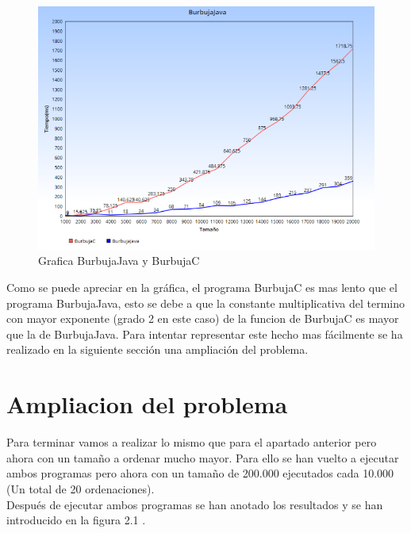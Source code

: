 	\begin{figure}[htb]
		\centering
		\includegraphics[width=1.0\textwidth]{./imagenes/4}
		\caption{Grafica BurbujaJava y BurbujaC} \label{fig:1}
	\end{figure}
	
	Como se puede apreciar en la gráfica, el programa BurbujaC es mas lento que el programa BurbujaJava, esto se debe a que la constante multiplicativa del termino con mayor exponente (grado 2 en este caso) de la funcion de BurbujaC es mayor que la de BurbujaJava. Para intentar representar este hecho mas fácilmente se ha realizado en la siguiente sección una ampliación del problema.\\
	
	\section[Ampliacion del problema]{Ampliacion del problema}
	
	Para terminar vamos a realizar lo mismo que para el apartado anterior pero ahora con un tamaño a ordenar mucho mayor. Para ello se han vuelto a ejecutar ambos programas pero ahora con un tamaño de 200.000 ejecutados cada 10.000 (Un total de 20 ordenaciones).\\
	
	Después de ejecutar ambos programas se han anotado los resultados y se han introducido en la figura 2.1 .
	
